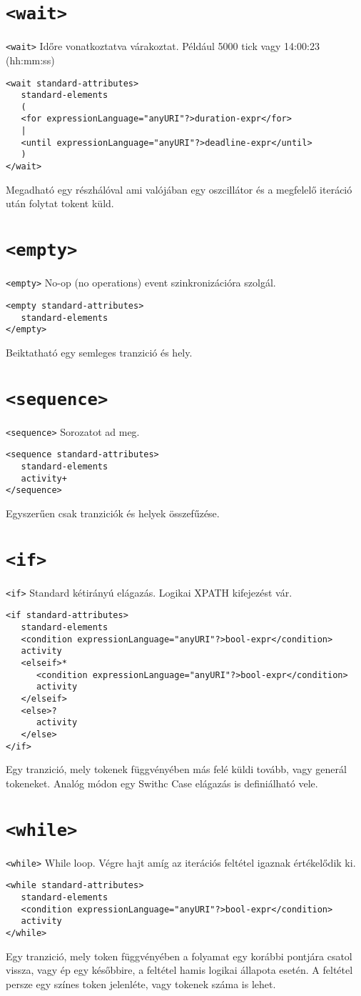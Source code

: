 \documentclass[12pt,a4paper]{book}
\begin{document}
\section{\texttt{<wait>}}
\texttt{<wait>} Időre vonatkoztatva várakoztat. Például 5000 tick vagy 14:00:23 (hh:mm:ss)
\begin{verbatim} 
<wait standard-attributes>
   standard-elements
   (
   <for expressionLanguage="anyURI"?>duration-expr</for>
   |
   <until expressionLanguage="anyURI"?>deadline-expr</until>
   )
</wait>
\end{verbatim}
Megadható egy részhálóval ami valójában egy oszcillátor és a megfelelő iteráció után folytat tokent küld. 

\section{\texttt{<empty>}}
\texttt{<empty>} No-op (no operations) event szinkronizációra szolgál.
\begin{verbatim}
<empty standard-attributes>
   standard-elements
</empty>
\end{verbatim}
Beiktatható egy semleges tranzició és hely.

\section{\texttt{<sequence>} }
\texttt{<sequence>} Sorozatot ad meg.
\begin{verbatim}
<sequence standard-attributes>
   standard-elements
   activity+
</sequence>
\end{verbatim} Egyszerűen csak tranziciók és helyek összefűzése. 

\section{\texttt{<if>}}
\texttt{<if>} Standard kétirányú elágazás. Logikai XPATH kifejezést vár. 
\begin{verbatim}
<if standard-attributes>
   standard-elements
   <condition expressionLanguage="anyURI"?>bool-expr</condition>
   activity
   <elseif>*
      <condition expressionLanguage="anyURI"?>bool-expr</condition>
      activity
   </elseif>
   <else>?
      activity
   </else>
</if>
\end{verbatim}
Egy tranzició, mely tokenek függvényében más felé küldi tovább, vagy generál tokeneket. Analóg módon egy Swithc Case elágazás is definiálható vele.

\section{\texttt{<while>}}
\texttt{<while>} While loop. Végre hajt amíg az iterációs feltétel igaznak értékelődik ki. 
\begin{verbatim}
<while standard-attributes>
   standard-elements
   <condition expressionLanguage="anyURI"?>bool-expr</condition>
   activity
</while>
\end{verbatim}
Egy tranzició, mely token függvényében a folyamat egy korábbi pontjára csatol vissza, vagy ép egy későbbire, a feltétel hamis logikai állapota esetén. A feltétel persze egy színes token jelenléte, vagy tokenek száma is lehet. 
\end{document}
